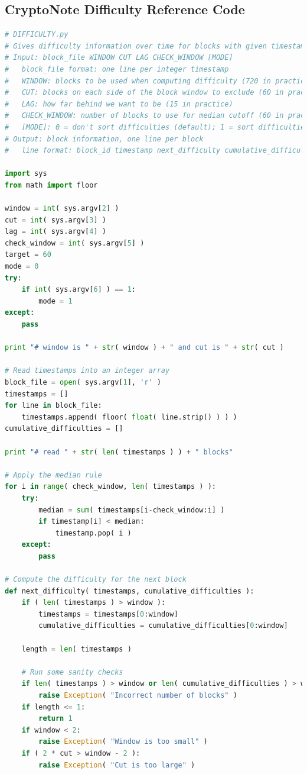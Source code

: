 \documentclass[12pt,english]{mrl}
\theoremstyle{definition}
\numberwithin{equation}{section}
\numberwithin{figure}{section}
\numberwithin{equation}{section}
\numberwithin{equation}{section}
\numberwithin{figure}{section}
\begin{document}
\newpage
\begin{appendices}
\chapter{CryptoNote Difficulty Reference Code}\label{referenceCode}

\begin{lstlisting}[language=Python,basicstyle=\small,breaklines=true]
# DIFFICULTY.py
# Gives difficulty information over time for blocks with given timestamps
# Input: block_file WINDOW CUT LAG CHECK_WINDOW [MODE]
#   block_file format: one line per integer timestamp
#   WINDOW: blocks to be used when computing difficulty (720 in practice)
#   CUT: blocks on each side of the block window to exclude (60 in practice)
#   LAG: how far behind we want to be (15 in practice)
#   CHECK_WINDOW: number of blocks to use for median cutoff (60 in practice)
#   [MODE]: 0 = don't sort difficulties (default); 1 = sort difficulties
# Output: block information, one line per block
#   line format: block_id timestamp next_difficulty cumulative_difficulty

import sys
from math import floor

window = int( sys.argv[2] )
cut = int( sys.argv[3] )
lag = int( sys.argv[4] )
check_window = int( sys.argv[5] )
target = 60
mode = 0
try:
    if int( sys.argv[6] ) == 1:
        mode = 1
except:
    pass

print "# window is " + str( window ) + " and cut is " + str( cut )

# Read timestamps into an integer array
block_file = open( sys.argv[1], 'r' )
timestamps = []
for line in block_file:
    timestamps.append( floor( float( line.strip() ) ) )
cumulative_difficulties = []

print "# read " + str( len( timestamps ) ) + " blocks"

# Apply the median rule
for i in range( check_window, len( timestamps ) ):
    try:
        median = sum( timestamps[i-check_window:i] )
        if timestamp[i] < median:
            timestamp.pop( i )
    except:
        pass

# Compute the difficulty for the next block
def next_difficulty( timestamps, cumulative_difficulties ):
    if ( len( timestamps ) > window ):
        timestamps = timestamps[0:window]
        cumulative_difficulties = cumulative_difficulties[0:window]
    
    length = len( timestamps )
    
    # Run some sanity checks
    if len( timestamps ) > window or len( cumulative_difficulties ) > window or len( timestamps ) != len( cumulative_difficulties ):
        raise Exception( "Incorrect number of blocks" )
    if length <= 1:
        return 1
    if window < 2:
        raise Exception( "Window is too small" )
    if ( 2 * cut > window - 2 ):
        raise Exception( "Cut is too large" )


\end{lstlisting}
\end{appendices}
\end{document}
